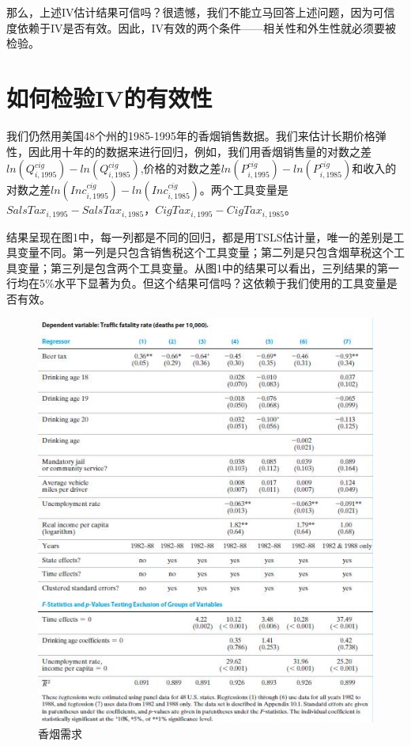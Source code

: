 \documentclass[cn,12pt,math=newtx,citestyle=gb7714-2015,bibstyle=gb7714-2015]{elegantbook}
\begin{document}
	那么，上述IV估计结果可信吗？很遗憾，我们不能立马回答上述问题，因为可信度依赖于IV是否有效。因此，IV有效的两个条件——相关性和外生性就必须要被检验。
	
	\section{如何检验IV的有效性}
	
	我们仍然用美国48个州的1985-1995年的香烟销售数据。我们来估计长期价格弹性，因此用十年的的数据来进行回归，例如，我们用香烟销售量的对数之差$ln(Q_{i,1995}^{cig})-ln(Q_{i,1985}^{cig})$,价格的对数之差$ln(P_{i,1995}^{cig})-ln(P_{i,1985}^{cig})$和收入的对数之差$ln(Inc_{i,1995}^{cig})-ln(Inc_{i,1985}^{cig})$。两个工具变量是$SalsTax_{i,1995}-SalsTax_{i,1985}$，$CigTax_{i,1995}-CigTax_{i,1985}$。
	
	结果呈现在图1中，每一列都是不同的回归，都是用TSLS估计量，唯一的差别是工具变量不同。第一列是只包含销售税这个工具变量；第二列是只包含烟草税这个工具变量；第三列是包含两个工具变量。从图1中的结果可以看出，三列结果的第一行均在5\%水平下显著为负。但这个结果可信吗？这依赖于我们使用的工具变量是否有效。
	
	
	\begin{figure}[htbp]
		\centering
		\includegraphics[width=1\textwidth]{results.jpg}
		\caption{香烟需求}\label{fig:digit}
	\end{figure}
	
\end{document}
